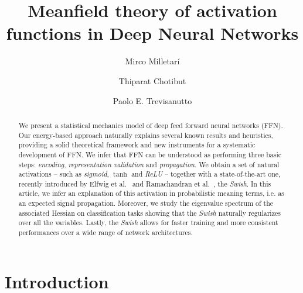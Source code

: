 \documentclass[5p]{elsarticle}
\begin{document}
\begin{frontmatter}

\title{Meanfield theory of activation functions in Deep Neural Networks}

 \author[mirco]{Mirco Milletar\'i }

 \author[thip]{Thiparat Chotibut }

 \author[paolo]{Paolo E. Trevisanutto}



\address[mirco]{Microsoft AI}
\address[thip]{Singapore University of Technology and Design, Singapore.}
\address[paolo]{Graphene Research Centre and CA2DM, National University of Singapore, Singapore. }


\begin{abstract}
We present a statistical mechanics model of deep feed forward neural networks (FFN). Our energy-based approach naturally explains several known results and heuristics,  providing a solid theoretical framework and new instruments for a systematic development of FFN. We infer that FFN can be understood as performing three basic steps: {\it encoding}, { \it representation validation} and {\it propagation}. We obtain a set of natural activations -- such as {\it sigmoid}, $\tanh$ and {\it ReLU} -- together with a state-of-the-art one, recently introduced by Elfwig et al.~\cite{elfwig} and Ramachandran et al.~\cite{prajit}, the \textit{Swish}. In this article, we infer an explanation of this activation in probabilistic meaning terms, i.e. as an expected signal propagation. Moreover, we study the eigenvalue spectrum of the associated Hessian on classification tasks showing that the {\it Swish} naturally regularizes over all the variables. Lastly, the {\it Swish} allows for faster training and more consistent performances over a wide range of network architectures.
\end{abstract}

\begin{keyword}

\end{keyword}

\end{frontmatter}

\linenumbers

\section{Introduction}
\end{document}
